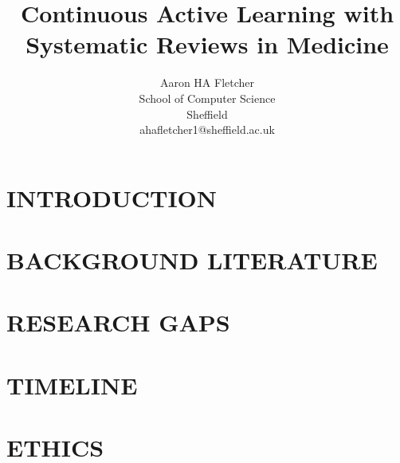 \documentclass[10pt, english]{article}
\title{\textbf{Continuous Active Learning with Systematic Reviews in Medicine}}
\author{
    \fontsize{11}{13}\selectfont 
    Aaron HA Fletcher \\
    \fontsize{10}{11}\selectfont 
     School of Computer Science\\
    \fontsize{10}{11}\selectfont 
    Sheffield\\
    \fontsize{10}{11}\selectfont
    ahafletcher1@sheffield.ac.uk\\
}
\date{}
\begin{document}
\renewcommand{\abstractname}{} %
\maketitle %
\newpage


\newpage


\setlength{\absleftindent}{0em}
\setlength{\absrightindent}{0em}

\begin{abstract}
\newpage 
    \abstractText %
\end{abstract}
\newpage
\tableofcontents
\newpage
\newcommand{\lightshadowbox}[1]{%
  \setlength{\fboxsep}{6pt}%
  \setlength{\shadowsize}{1pt}%
  \shadowbox{#1}%
}

\newpage
\section{INTRODUCTION}


\newpage
\section{BACKGROUND LITERATURE}

\newpage




\newpage




\newpage

\newpage
\newpage
\section{RESEARCH GAPS}



\newpage
\newpage
\section{TIMELINE}

\newpage
\section{ETHICS}

\newpage
\end{document}
